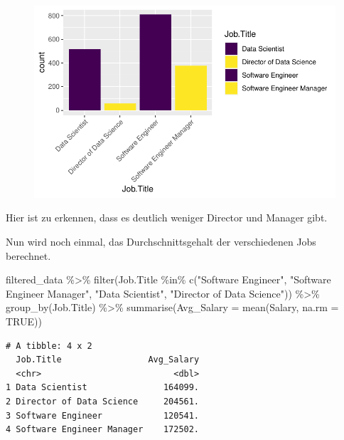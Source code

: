 \documentclass[
  letterpaper,
  DIV=11,
  numbers=noendperiod]{scrartcl}
\newenvironment{Shaded}{\begin{snugshade}}{\end{snugshade}}
\newcommand{\AttributeTok}[1]{\textcolor[rgb]{0.40,0.45,0.13}{#1}}
\newcommand{\ConstantTok}[1]{\textcolor[rgb]{0.56,0.35,0.01}{#1}}
\newcommand{\FunctionTok}[1]{\textcolor[rgb]{0.28,0.35,0.67}{#1}}
\newcommand{\NormalTok}[1]{\textcolor[rgb]{0.00,0.23,0.31}{#1}}
\newcommand{\SpecialCharTok}[1]{\textcolor[rgb]{0.37,0.37,0.37}{#1}}
\newcommand{\StringTok}[1]{\textcolor[rgb]{0.13,0.47,0.30}{#1}}
\begin{document}
\begin{figure}[H]

{\centering \includegraphics{main_doc_files/figure-pdf/unnamed-chunk-162-1.pdf}

}

\end{figure}

Hier ist zu erkennen, dass es deutlich weniger Director und Manager
gibt.

Nun wird noch einmal, das Durchschnittsgehalt der verschiedenen Jobs
berechnet.

\begin{Shaded}
\begin{Highlighting}[]
\NormalTok{filtered\_data }\SpecialCharTok{\%\textgreater{}\%}
  \FunctionTok{filter}\NormalTok{(Job.Title }\SpecialCharTok{\%in\%} \FunctionTok{c}\NormalTok{(}\StringTok{"Software Engineer"}\NormalTok{, }\StringTok{"Software Engineer Manager"}\NormalTok{, }\StringTok{"Data Scientist"}\NormalTok{, }\StringTok{"Director of Data Science"}\NormalTok{)) }\SpecialCharTok{\%\textgreater{}\%}
  \FunctionTok{group\_by}\NormalTok{(Job.Title) }\SpecialCharTok{\%\textgreater{}\%}
  \FunctionTok{summarise}\NormalTok{(}\AttributeTok{Avg\_Salary =} \FunctionTok{mean}\NormalTok{(Salary, }\AttributeTok{na.rm =} \ConstantTok{TRUE}\NormalTok{))}
\end{Highlighting}
\end{Shaded}

\begin{verbatim}
# A tibble: 4 x 2
  Job.Title                 Avg_Salary
  <chr>                          <dbl>
1 Data Scientist               164099.
2 Director of Data Science     204561.
3 Software Engineer            120541.
4 Software Engineer Manager    172502.
\end{verbatim}
\end{document}

